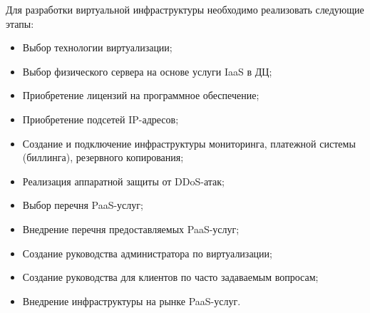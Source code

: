 Для разработки виртуальной инфраструктуры необходимо реализовать следующие этапы:
\begin{itemize}
    \item Выбор технологии виртуализации;
    \item Выбор физического сервера на основе услуги IaaS в ДЦ;
    \item Приобретение лицензий на программное обеспечение;
    \item Приобретение подсетей IP-адресов;
    \item Создание и подключение инфраструктуры мониторинга, платежной системы (биллинга), резервного копирования;
    \item Реализация аппаратной защиты от DDoS-атак;
    \item Выбор перечня PaaS-услуг;
    \item Внедрение перечня предоставляемых PaaS-услуг;
    \item Создание руководства администратора по виртуализации;
    \item Создание руководства для клиентов по часто задаваемым вопросам;
    \item Внедрение инфраструктуры на рынке PaaS-услуг.
\end{itemize}

\clearpage
